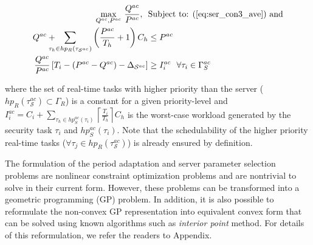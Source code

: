 \documentclass[../rt_server_main.tex]{subfiles}
\begin{document}
\begin{myoptimizationproblem} \label{opt:server_param_ave}
\vspace*{-2.0em}
\begin{subequations}
\begin{align}
\underset{Q^{ac}, P^{ac}}{\operatorname{max}}~ \frac{Q^{ac}}{P^{ac}}, ~~& %
\text{Subject to:   (\ref{eq:ser_con3_ave})~and} %
\nonumber \\
Q^{ac} + \hspace*{-1em} \sum\limits_{\tau_h \in hp_R(\tau_{\mathcal{S}^{ac}})} \left( \frac{P^{ac}}{T_h} + 1 \right)  C_h &\leq P^{ac} \label{eq:ser_con1_ave}
  \\
   \frac{Q^{ac}}{P^{ac}} \left[ T_i - (P^{ac} - Q^{ac}) - \Delta_{\mathcal{S}^{ac}}  \right] &\geq I_i^{ac} ~~ \forall \tau_i \in \Gamma_S^{ac} \label{eq:ser_con2_ave}
\end{align}
\end{subequations}
\end{myoptimizationproblem}
\hspace{-1.9em} 
where the set of real-time tasks with higher priority than the server (\ie $hp_R(\tau_\mathcal{S}^{ac}) \subset \Gamma_R$) is a constant for a given priority-level and $I_i^{ac} = C_i + \sum\limits_{\tau_h \in hp_S^{ac}(\tau_i)} \left\lceil \frac{T_i}{T_h} \right\rceil C_h$ is the worst-case workload generated by the security task $\tau_i$ and $hp_S^{ac}(\tau_i)$. Note that the schedulability of the higher priority real-time tasks (\eg $\forall \tau_j \in hp_R(\tau_\mathcal{S}^{ac})$) is already ensured by definition. %

\begin{remark}
The formulation of the period adaptation and server parameter selection problems are nonlinear constraint optimization problems and are nontrivial to solve in their current form. However, these problems can be transformed  into a geometric programming (GP) \cite{GP_tutorial} problem. %
In addition, it is also possible to reformulate the non-convex GP representation into equivalent convex form that can be solved using known algorithms such as \textit{interior point} \cite[Ch. 11]{boyd_book} method. For details of this reformulation, we refer the readers to Appendix. %
\end{remark}

 
\end{document}
